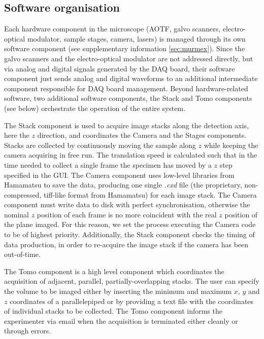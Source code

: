 \documentclass[12pt]{spieman}  %
\begin{document}
\subsection{Software organisation}
Each hardware component in the microscope (AOTF, galvo scanners, electro-optical modulator, sample stages, camera, lasers) is managed through its own software component (see supplementary information \ref{sec:murmex}). Since the galvo scanners and the electro-optical modulator are not addressed directly, but via analog and digital signals generated by the DAQ board, their software component just sends analog and digital waveforms to an additional intermediate component responsible for DAQ board management. Beyond hardware-related software, two additional software components, the Stack and Tomo components (see below) orchestrate the operation of the entire system. 

The Stack component is used to acquire image stacks along the detection axis, here the $z$ direction, and coordinates the Camera and the Stages components. Stacks are collected by continuously moving the sample along $z$ while keeping the camera acquiring in free run. The translation speed is calculated such that in the time needed to collect a single frame the specimen has moved by a $z$ step specified in the GUI. The Camera component uses low-level libraries from Hamamatsu to save the data, producing one single \emph{.cxd} file (the proprietary, non-compressed, tiff-like format from Hamamatsu) for each image stack. The Camera component must write data to disk with perfect synchronisation, otherwise the nominal $z$ position of each frame is no more coincident with the real $z$ position of the plane imaged. For this reason, we set the process executing the Camera code to be of highest priority. Additionally, the Stack component checks the timing of data production, in order to re-acquire the image stack if the camera has been out-of-time. %

The Tomo component is a high level component which coordinates the acquisition of adjacent, parallel, partially-overlapping stacks. %
The user can specify the volume to be imaged either by inserting the minimum and maximum $x$, $y$ and $z$ coordinates of a parallelepiped or by providing a text file with the coordinates of individual stacks to be collected. The Tomo component informs the experimenter via email when the acquisition is terminated either cleanly or through errors.
\end{document}

